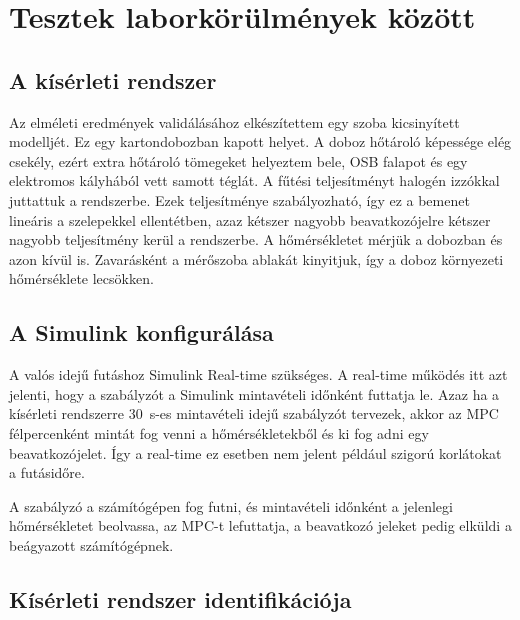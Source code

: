 \chapter{Tesztek laborkörülmények között}

\section{A kísérleti rendszer}
Az elméleti eredmények validálásához elkészítettem egy szoba kicsinyített modelljét. Ez egy kartondobozban kapott helyet. A doboz hőtároló képessége elég csekély, ezért extra hőtároló tömegeket helyeztem bele, OSB falapot és egy elektromos kályhából vett samott téglát.
A fűtési teljesítményt halogén izzókkal juttattuk a rendszerbe. Ezek teljesítménye szabályozható, így ez a bemenet lineáris a szelepekkel ellentétben, azaz kétszer nagyobb beavatkozójelre kétszer nagyobb teljesítmény kerül a rendszerbe.
A hőmérsékletet mérjük a dobozban és azon kívül is. Zavarásként a mérőszoba ablakát kinyitjuk, így a doboz környezeti hőmérséklete lecsökken.

\section{A Simulink konfigurálása}
A valós idejű futáshoz Simulink  Real-time szükséges. A real-time működés itt azt jelenti, hogy a szabályzót a Simulink mintavételi időnként futtatja le. Azaz ha a kísérleti rendszerre \SI{30}{\second}-es mintavételi idejű szabályzót tervezek, akkor az MPC félpercenként mintát fog venni a hőmérsékletekből és ki fog adni egy beavatkozójelet. Így a real-time ez esetben nem jelent például szigorú korlátokat a futásidőre.



A szabályzó a számítógépen fog futni, és mintavételi időnként a jelenlegi hőmérsékletet beolvassa, az MPC-t lefuttatja, a beavatkozó jeleket pedig elküldi a beágyazott számítógépnek.






\section{Kísérleti rendszer identifikációja}

